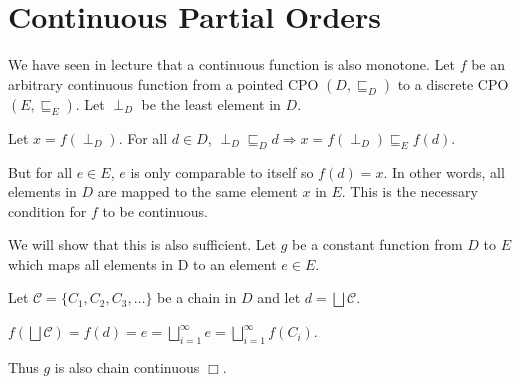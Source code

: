 \section{Continuous Partial Orders}

We have seen in lecture that a continuous function is also monotone. Let $f$ be an arbitrary continuous function from a pointed CPO $(D, \sqsubseteq_D)$ to a discrete CPO $(E, \sqsubseteq_E)$. Let $\perp_D$ be the least element in $D$.

Let $x = f(\perp_D)$. For all $d \in D$, $\perp_D \sqsubseteq_D d \Rightarrow x = f(\perp_D) \sqsubseteq_E f(d)$. 

But for all $e \in E$, $e$ is only comparable to itself so $f(d) = x$. In other words, all elements in $D$ are mapped to the same element $x$ in $E$. This is the necessary condition for $f$ to be continuous.

We will show that this is also sufficient. Let $g$ be a constant function from $D$ to $E$ which maps all elements in D to an element $e \in E$. 

Let $\mathcal C = \{C_1, C_2, C_3, \ldots\}$ be a chain in $D$ and let $d = \bigsqcup \mathcal C$.

$f(\bigsqcup \mathcal C) = f(d) = e = \bigsqcup\limits_{i = 1}^{\infty} e = \bigsqcup\limits_{i = 1}^{\infty} f(C_i)$.

Thus $g$ is also chain continuous $\Box$.